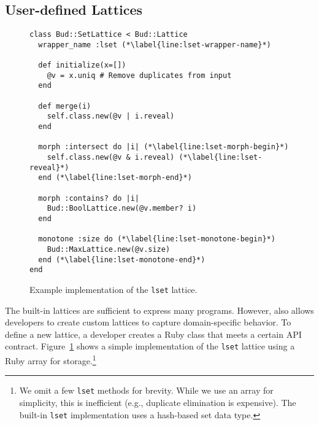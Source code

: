 \subsection{User-defined Lattices}
\begin{figure}[t]
\begin{scriptsize}
\begin{lstlisting}[deletekeywords={lset}]
class Bud::SetLattice < Bud::Lattice
  wrapper_name :lset (*\label{line:lset-wrapper-name}*)

  def initialize(x=[])
    @v = x.uniq # Remove duplicates from input
  end

  def merge(i)
    self.class.new(@v | i.reveal)
  end

  morph :intersect do |i| (*\label{line:lset-morph-begin}*)
    self.class.new(@v & i.reveal) (*\label{line:lset-reveal}*)
  end (*\label{line:lset-morph-end}*)

  morph :contains? do |i|
    Bud::BoolLattice.new(@v.member? i)
  end

  monotone :size do (*\label{line:lset-monotone-begin}*)
    Bud::MaxLattice.new(@v.size)
  end (*\label{line:lset-monotone-end}*)
end
\end{lstlisting}
\end{scriptsize}
\caption{Example implementation of the \texttt{lset} lattice.}
\label{fig:lattice-lset}
\end{figure}

\label{sec:lattice-api}
The built-in lattices are sufficient to express many programs. However, \lang
also allows developers to create custom lattices to capture domain-specific
behavior. To define a new lattice, a developer creates a Ruby class that meets a
certain API contract. Figure~\ref{fig:lattice-lset} shows a simple
implementation of the \texttt{lset} lattice using a Ruby array for
storage.\footnote{We omit a few \texttt{lset} methods for brevity. While we use
  an array for simplicity, this is inefficient (e.g., duplicate elimination is
  expensive). The built-in \texttt{lset} implementation uses a hash-based set data type.}

